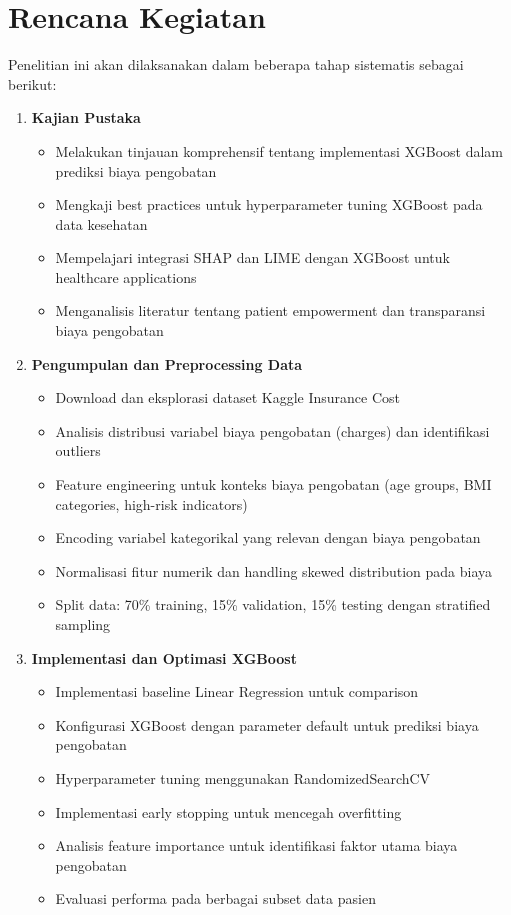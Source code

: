 \section{Rencana Kegiatan}

Penelitian ini akan dilaksanakan dalam beberapa tahap sistematis sebagai berikut:

\begin{enumerate}
    \item \textbf{Kajian Pustaka}
    \begin{itemize}
        \item Melakukan tinjauan komprehensif tentang implementasi XGBoost dalam prediksi biaya pengobatan
        \item Mengkaji best practices untuk hyperparameter tuning XGBoost pada data kesehatan
        \item Mempelajari integrasi SHAP dan LIME dengan XGBoost untuk healthcare applications
        \item Menganalisis literatur tentang patient empowerment dan transparansi biaya pengobatan
    \end{itemize}

\item \textbf{Pengumpulan dan Preprocessing Data}
\begin{itemize}
    \item Download dan eksplorasi dataset Kaggle Insurance Cost 
    \item Analisis distribusi variabel biaya pengobatan (charges) dan identifikasi outliers
    \item Feature engineering untuk konteks biaya pengobatan (age groups, BMI categories, high-risk indicators)
    \item Encoding variabel kategorikal yang relevan dengan biaya pengobatan
    \item Normalisasi fitur numerik dan handling skewed distribution pada biaya
    \item Split data: 70\% training, 15\% validation, 15\% testing dengan stratified sampling
\end{itemize}
    
    \item \textbf{Implementasi dan Optimasi XGBoost}
    \begin{itemize}
        \item Implementasi baseline Linear Regression untuk comparison
        \item Konfigurasi XGBoost dengan parameter default untuk prediksi biaya pengobatan
        \item Hyperparameter tuning menggunakan RandomizedSearchCV
        \item Implementasi early stopping untuk mencegah overfitting
        \item Analisis feature importance untuk identifikasi faktor utama biaya pengobatan
        \item Evaluasi performa pada berbagai subset data pasien
    \end{itemize}
    

\end{enumerate}
